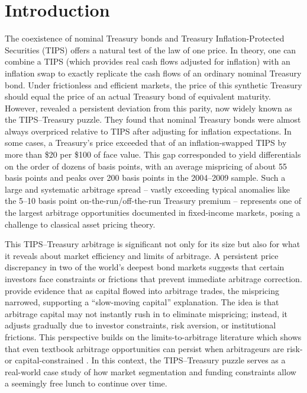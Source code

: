 \documentclass[12pt]{article}
\begin{document}
\doublespacing
\section{Introduction}

The coexistence of nominal Treasury bonds and Treasury Inflation-Protected Securities (TIPS) offers a natural test of the law of one price. 
In theory, one can combine a TIPS (which provides real cash flows adjusted for inflation) with an inflation swap to exactly replicate the 
cash flows of an ordinary nominal Treasury bond. Under frictionless and efficient markets, the price of this synthetic Treasury should equal the 
price of an actual Treasury bond of equivalent maturity. However, \cite{Fleckenstein} revealed a persistent deviation from 
this parity, now widely known as the TIPS–Treasury puzzle. They found that nominal Treasury bonds were almost always overpriced relative to TIPS after adjusting for inflation 
expectations. In some cases, a Treasury’s price exceeded that of an inflation-swapped TIPS by more than \$20 per \$100 of face value. 
This gap corresponded to yield differentials on the order of dozens of basis points, with an average mispricing of about 55 basis points and peaks 
over 200 basis points in the 2004–2009 sample. 
Such a large and systematic arbitrage spread – vastly exceeding typical anomalies like the 5–10 basis point on-the-run/off-the-run Treasury premium 
 – represents one of the largest arbitrage opportunities documented in fixed-income markets, posing a challenge to classical asset pricing theory.

This TIPS–Treasury arbitrage is significant not only for its size but also for what it reveals about market efficiency and limits of arbitrage. 
A persistent price discrepancy in two of the world’s deepest bond markets suggests that certain investors face constraints or frictions that prevent 
immediate arbitrage correction. \cite{Fleckenstein} provide evidence that as capital flowed into arbitrage trades, the mispricing narrowed, 
supporting a “slow-moving capital” explanation. The idea is that arbitrage capital may not instantly rush in to eliminate mispricing; instead, it adjusts gradually due to 
investor constraints, risk aversion, or institutional frictions. This perspective builds on the limits-to-arbitrage literature \citep{Shleifer1997-py} 
which shows that even textbook arbitrage opportunities can persist when arbitrageurs are risk- or capital-constrained 
\citep{Fleckenstein}. In this context, the TIPS–Treasury puzzle serves as a real-world case study of how market segmentation and funding 
constraints allow a seemingly free lunch to continue over time.
\end{document}
